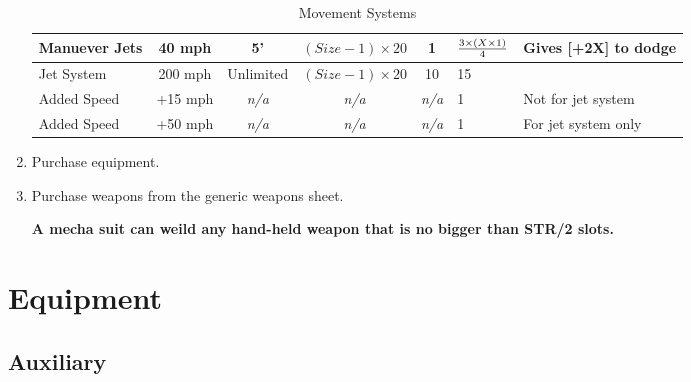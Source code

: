 \documentclass[twoside]{book}
\begin{document}
\begin{enumerate}
\begin{table}[!htb]
\begin{center}
\begin{tabular}{|l|c|c|c|c|p{2em}|p{5em}|}
Manuever Jets&40 mph&5'&\begin{math}(Size-1)\times 20\end{math}&1&\begin{math}{{3\times (X\times 1)}\over{4}}\end{math}&Gives [+2X] to dodge\\
\hline
Jet System&200 mph&Unlimited&\begin{math}(Size-1)\times 20\end{math}&10&15\\
\hline
Added Speed&+15 mph&\textit{n/a}&\textit{n/a}&\textit{n/a}&1&Not for jet system\\
\hline
Added Speed&+50 mph&\textit{n/a}&\textit{n/a}&\textit{n/a}&1&For jet system only\\
\hline

  \end{tabular}
  
\caption{Movement Systems}
  
  \end{center}
\end{table}
  
  \item 
    {  
    Purchase equipment.
    }
  
  \item 
    {  
    Purchase weapons from the generic weapons sheet.
    }
  

 \textbf{A mecha suit can weild any hand-held weapon that is no bigger than STR/2 slots.}


\end{enumerate}
  
    

\section{Equipment}
    
    

\subsection{Auxiliary}
    
\end{document}
